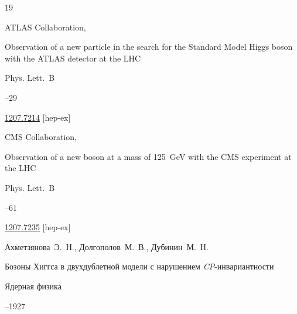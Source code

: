 \begin{thebibliography}{19}




\by ATLAS Collaboration,

\paper Observation of a new particle in the search for the Standard Model Higgs boson with the ATLAS detector at the LHC

\jour   	Phys. Lett.~B



--29


\arxiv \href{https://arxiv.org/abs/1207.7214}{1207.7214} [hep-ex]







\by CMS Collaboration,

\paper Observation of a new boson at a mass of 125~GeV with the CMS experiment at the LHC

\jour   	Phys. Lett.~B




--61


\arxiv \href{https://arxiv.org/abs/1207.7235}{1207.7235} [hep-ex]




\by Ахметзянова~Э.~Н., Долгополов~М.~В., Дубинин~М.~Н.

\paper Бозоны Хиггса в двухдублетной модели с нарушением {\it CP}-инвариантности

\jour Ядерная физика




--1927






\end{thebibliography}

